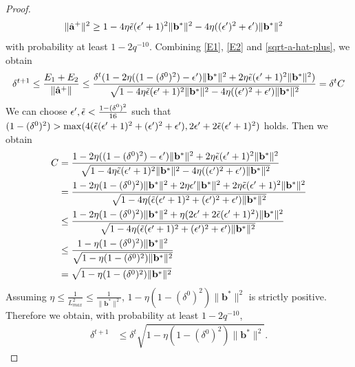 \documentclass{article}
\theoremstyle{plain}
\theoremstyle{definition}
\theoremstyle{remark}
\begin{document}
\begin{proof}
\begin{align}
    \lVert \hat{\mathbf{a}}^+\rVert^2 &\geq 1-4\eta \Tilde{\epsilon} (\epsilon'+1)^2\lVert \mathbf{b}^* \rVert^2 - 4\eta ((\epsilon')^2+\epsilon')\lVert \mathbf{b}^*\rVert^2 \label{sqrt-a-hat-plus}
\end{align}
with probability at least $1-2q^{-10}$. Combining \eqref{E1}, \eqref{E2} and \eqref{sqrt-a-hat-plus}, we obtain
\begin{align}
   \delta^{t+1} \leq \frac{E_1+E_2}{\lVert \hat{\mathbf{a}}^+\rVert} \leq \frac{\delta^t( 1-2\eta ((1-(\delta^{0})^2) - \epsilon' )\lVert {\mathbf{b}^*}\rVert^2 +2\eta \Tilde{\epsilon} (\epsilon' +1)^2\lVert \mathbf{b}^*\rVert^2)}{\sqrt{1-4\eta \Tilde{\epsilon} (\epsilon'+1)^2\lVert \mathbf{b}^* \rVert^2 - 4\eta ((\epsilon')^2+\epsilon')\lVert \mathbf{b}^*\rVert^2}} = \delta^t C
\end{align}
We can choose $\epsilon',\Tilde{\epsilon}<\frac{1-(\delta^0)^2}{16}$ such that $(1-(\delta^{0})^2)> \max (4(\Tilde{\epsilon}(\epsilon'+1)^2+(\epsilon')^2+\epsilon'), 2\epsilon' +2\Tilde{\epsilon}(\epsilon'+1)^2)$ holds. Then we obtain
\begin{align}
    C &= \frac{ 1-2\eta ((1-(\delta^{0})^2) - \epsilon' )\lVert {\mathbf{b}^*}\rVert^2 +2\eta \Tilde{\epsilon} (\epsilon' +1)^2\lVert \mathbf{b}^*\rVert^2}{\sqrt{1-4\eta \Tilde{\epsilon} (\epsilon'+1)^2\lVert \mathbf{b}^* \rVert^2 - 4\eta ((\epsilon')^2+\epsilon')\lVert \mathbf{b}^*\rVert^2}} \\
    &=  \frac{ 1-2\eta (1-(\delta^{0})^2)\lVert {\mathbf{b}^*}\rVert^2 + 2\eta \epsilon' \lVert {\mathbf{b}^*}\rVert^2 +2\eta \Tilde{\epsilon} (\epsilon' +1)^2\lVert \mathbf{b}^*\rVert^2}{\sqrt{1-4\eta (\Tilde{\epsilon} (\epsilon'+1)^2 +  (\epsilon')^2+\epsilon')\lVert \mathbf{b}^*\rVert^2}} \\
    &\leq \frac{ 1-2\eta (1-(\delta^{0})^2)\lVert {\mathbf{b}^*}\rVert^2 + \eta (2\epsilon' + 2\Tilde{\epsilon} (\epsilon'+1)^2)\lVert \mathbf{b}^*\rVert^2}{\sqrt{1-4\eta (\Tilde{\epsilon} (\epsilon'+1)^2 +  (\epsilon')^2+\epsilon')\lVert \mathbf{b}^*\rVert^2}} \\
    &\leq \frac{1-\eta (1-(\delta^{0})^2)\lVert \mathbf{b}^*\rVert^2}{\sqrt{1-\eta (1-(\delta^{0})^2)\lVert \mathbf{b}^*\rVert^2}} \\
    & = \sqrt{1-\eta (1-(\delta^{0})^2)\lVert \mathbf{b}^*\rVert^2}
\end{align}
Assuming $\eta \leq \frac{1}{L_{max}^2} \le \frac{1}{\lVert \mathbf{b}^*\rVert^2}$, $1-\eta (1-(\delta^{0})^2)\lVert \mathbf{b}^*\rVert^2$ is strictly positive. Therefore we obtain, with probability at least $1-2q^{-10}$, 
\begin{align}
    \delta^{t+1} &\leq \delta^{t} \sqrt{1-\eta (1-(\delta^{0})^2)\lVert \mathbf{b}^*\rVert^2}.
\end{align}

    
\end{proof}
\end{document}
